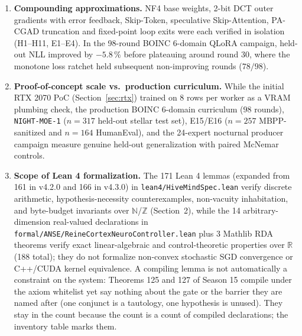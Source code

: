 \documentclass[11pt,a4paper]{article}
\begin{document}
\begin{enumerate}[leftmargin=1.8em]
    \item \textbf{Compounding approximations.} NF4 base weights, 2-bit DCT outer gradients with error feedback, Skip-Token, speculative Skip-Attention, PA-CGAD truncation and fixed-point loop exits were each verified in isolation (H1--H11, E1--E4). In the 98-round BOINC 6-domain QLoRA campaign, held-out NLL improved by $-5.8\,\%$ before plateauing around round 30, where the monotone loss ratchet held subsequent non-improving rounds ($78/98$).
    \item \textbf{Proof-of-concept scale vs.\ production curriculum.} While the initial RTX 2070 PoC (Section~\ref{sec:rtx}) trained on 8 rows per worker as a VRAM plumbing check, the production BOINC 6-domain curriculum ($98$ rounds), \texttt{NIGHT-MOE-1} ($n=317$ held-out stellar test set), E15/E16 ($n=257$ MBPP-sanitized and $n=164$ HumanEval), and the 24-expert nocturnal producer campaign measure genuine held-out generalization with paired McNemar controls.
    \item \textbf{Scope of Lean 4 formalization.} The 171 Lean 4 lemmas (expanded from 161 in v4.2.0 and 166 in v4.3.0) in \texttt{lean4/HiveMindSpec.lean} verify discrete arithmetic, hypothesis-necessity counterexamples, non-vacuity inhabitation, and byte-budget invariants over $\mathbb{N}$/$\mathbb{Z}$ (Section~2), while the 14 arbitrary-dimension real-valued declarations in \texttt{formal/ANSE/ReineCortexNeuroController.lean} plus 3 Mathlib RDA theorems verify exact linear-algebraic and control-theoretic properties over $\mathbb{R}$ (188 total); they do not formalize non-convex stochastic SGD convergence or C++/CUDA kernel equivalence. A compiling lemma is not automatically a constraint on the system: Theorems 125 and 127 of Season 15 compile under the axiom whitelist yet say nothing about the gate or the barrier they are named after (one conjunct is a tautology, one hypothesis is unused). They stay in the count because the count is a count of compiled declarations; the inventory table marks them.

\end{enumerate}
\end{document}
